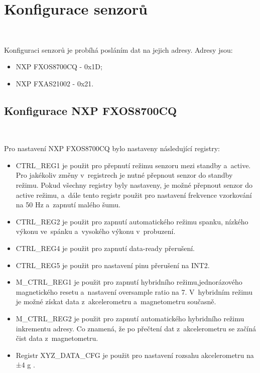 \section{Konfigurace senzorů}\

Konfiguraci senzorů je probíhá posláním dat na jejich adresy. Adresy jsou:
\begin{itemize}
    \item NXP FXOS8700CQ - 0x1D;
    \item NXP FXAS21002 - 0x21.
\end{itemize}

\subsection{Konfigurace NXP FXOS8700CQ}\

Pro nastavení NXP FXOS8700CQ bylo nastaveny následující registry: 

\begin{itemize}
    \item CTRL\_REG1 je použit pro přepnutí režimu senzoru mezi standby a~active.
    Pro jakékoliv změny v~registrech je nutné přepnout senzor do standby režimu.
    Pokud všechny registry byly nastaveny, je možné přepnout senzor do active
    režimu, a~dále tento registr použit pro nastavení frekvence vzorkování na 50 Hz
    a~zapnutí malého šumu.

    \item CTRL\_REG2 je použit pro zapnutí automatického režimu spanku, nízkého
    výkonu ve~spánku a~vysokého výkonu v~probuzení.

    \item CTRL\_REG4 je použit pro zapnutí data-ready přerušení.

    \item CTRL\_REG5 je použit pro nastavení pinu přerušení na INT2.

    \item M\_CTRL\_REG1 je použit pro zapnutí hybridního režimu,jednorázového
    magnetického resetu a~nastavení oversample ratio na 7. V~hybridním režimu je
    možné získat data z~akcelerometru a~magnetometru současně.

    \item M\_CTRL\_REG2 je použit pro zapnutí automatického hybridního režimu
    inkrementu adresy. Co znamená, že po přečtení dat z~akcelerometru se začíná čist
    data z~magnetometru.

    \item Registr XYZ\_DATA\_CFG je použit pro nastavení rozsahu akcelerometru na ±4
    g \cite{FXOS8700CQ}.
\end{itemize}

